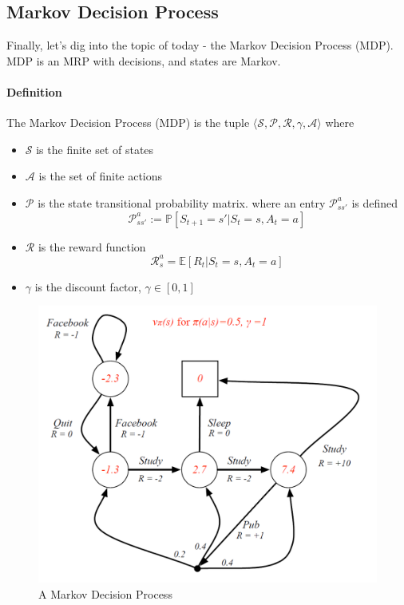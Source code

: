 \documentclass{article}
\begin{document}
	
	\subsection{Markov Decision Process}
	Finally, let's dig into the topic of today - the Markov Decision Process (MDP). MDP is an MRP with decisions, and states are Markov.
	\paragraph{Definition} The Markov Decision Process (MDP) is the tuple $\langle \mathcal{S, P, R, \gamma, A} \rangle$ where 
	\begin{itemize}
		\item $\mathcal{S}$ is the finite set of states
		\item $\mathcal{A}$ is the set of finite actions 
		\item $\mathcal{P}$ is the state transitional probability matrix. where an entry $\mathcal{P}^a_{ss'}$ is defined
		\begin{equation*}
		\mathcal{P}^a_{ss'} := \mathbb{P}[S_{t+1} = s' | S_t = s, A_t = a] 
		\end{equation*}
		\item $\mathcal{R}$ is the reward function 
		\begin{equation*}
		\mathcal{R}^a_s = \mathbb{E}[R_t | S_t = s, A_t = a]
		\end{equation*}
		\item $\gamma$ is the discount factor, $\gamma \in [0,1]$
	\end{itemize}
	
	\begin{figure}[h]
		\centering
		\includegraphics[scale=0.5]{ch2fig2.png}
		\caption{A Markov Decision Process}
	\end{figure}
	
\end{document}
